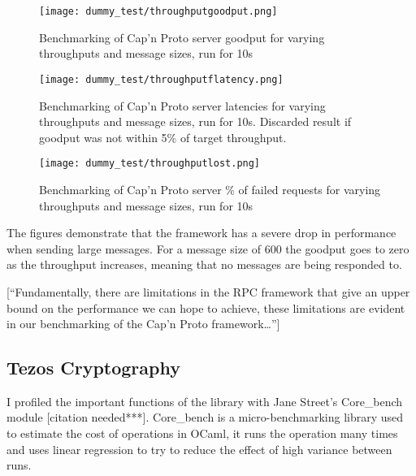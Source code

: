 \begin{figure}[h!]
\centering
\texttt{[image: dummy\_test/throughputgoodput.png]}
\caption{Benchmarking of Cap'n Proto server goodput for varying throughputs and message sizes, run for 10s}
\end{figure}

\begin{figure}[h!]
\centering
\texttt{[image: dummy\_test/throughputflatency.png]}
\caption{Benchmarking of Cap'n Proto server latencies for varying throughputs and message sizes, run for 10s. Discarded result if goodput was not within 5\% of target throughput.}
\end{figure}

\begin{figure}[h!]
\centering
\texttt{[image: dummy\_test/throughputlost.png]}
\caption{Benchmarking of Cap'n Proto server \% of failed requests for varying throughputs and message sizes, run for 10s}
\end{figure}

The figures demonstrate that the framework has a severe drop in performance when sending large messages. For a message size of 600 the goodput goes to zero as the throughput increases, meaning that no messages are being responded to.

[``Fundamentally, there are limitations in the RPC framework that give an upper bound on the performance we can hope to achieve, these limitations are evident in our benchmarking of the Cap'n Proto framework\dots'']

\subsection{Tezos Cryptography} \label{tezosbenchmark}
I profiled the important functions of the library with Jane Street's Core\_bench module [citation needed***]. Core\_bench is a micro-benchmarking library used to estimate the cost of operations in OCaml, it runs the operation many times and uses linear regression to try to reduce the effect of high variance between runs.

